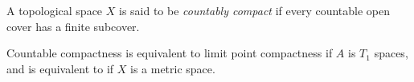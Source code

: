 \documentclass[12pt]{article}
\begin{document}
A topological space $X$ is said to be \emph{countably compact} if every countable open cover has a finite subcover.

Countable compactness is equivalent to limit point compactness if $A$ is $T_1$ spaces, and is equivalent to  if $X$ is a metric space.

\end{document}
